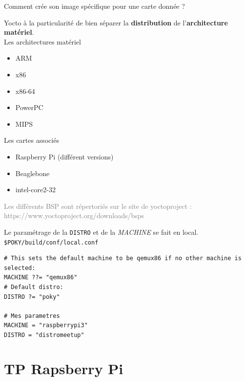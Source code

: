 \documentclass[compress]{smilebeamer}
\begin{document}
\begin{frame}
\begin{center}
\textcolor{smileOrange}{\huge{Comment crée son image spécifique pour une carte donnée ?}}
\end{center}
\end{frame}

\begin{frame}
Yocto à la particularité de bien séparer la \textbf{distribution} de l'\textbf{architecture matériel}.
\newline \\
Les architectures matériel
\begin{itemize}
	\item ARM
	\item x86
	\item x86-64
	\item PowerPC
	\item MIPS
\end{itemize}
Les cartes associés
\begin{itemize}
	\item Raspberry Pi (différent versions)
	\item Beaglebone
	\item intel-core2-32
\end{itemize}
\textcolor{gray}{\tiny{Les différents BSP sont répertoriés sur le site de yoctoproject : https://www.yoctoproject.org/downloads/bsps}}
\end{frame}

\begin{frame}[fragile]
Le paramétrage de la \texttt{DISTRO} et de la \textsl{MACHINE} se fait en local.
\newline \\
\texttt{\$POKY/build/conf/local.conf}
\begin{lstlisting}[style=bitbake]
# This sets the default machine to be qemux86 if no other machine is selected:
MACHINE ??= "qemux86"
# Default distro:
DISTRO ?= "poky"

# Mes parametres
MACHINE = "raspberrypi3"
DISTRO = "distromeetup"
\end{lstlisting}
\end{frame}


\section{TP Rapsberry Pi}
\end{document}
